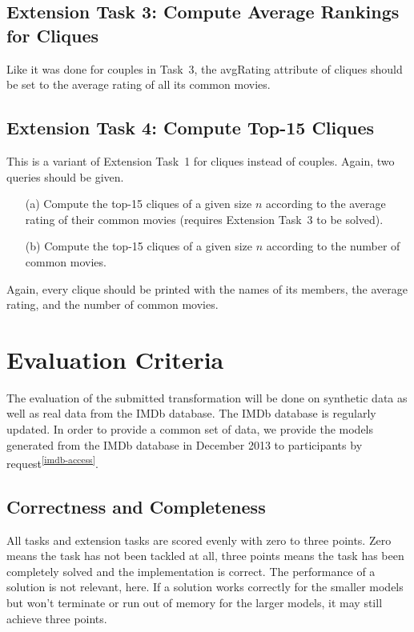 \documentclass[a4paper,11pt]{article}
\newcommand{\p}[1]{\textsf{\small #1}}
\begin{document}
\subsection{Extension Task 3: Compute Average Rankings for Cliques}

Like it was done for couples in Task~3, the \p{avgRating} attribute of
cliques should be set to the average rating of all its common movies.

\subsection{Extension Task 4: Compute Top-15 Cliques}

This is a variant of Extension Task~1 for cliques instead of couples.  Again,
two queries should be given.

\begin{enumerate}
\item[(a)] Compute the top-15 cliques of a given size \(n\) according to the
  average rating of their common movies (requires Extension Task~3 to be
  solved).
\item[(b)] Compute the top-15 cliques of a given size \(n\) according to the
  number of common movies.
\end{enumerate}

Again, every clique should be printed with the names of its members, the
average rating, and the number of common movies.


\section{Evaluation Criteria}\label{sec-eval}

The evaluation of the submitted transformation will be done on synthetic data
as well as real data from the IMDb database.  The IMDb database is regularly
updated.  In order to provide a common set of data, we provide the models
generated from the IMDb database in December 2013 to participants by
request\textsuperscript{\ref{imdb-access}}.

\subsection{Correctness and Completeness}

All tasks and extension tasks are scored evenly with zero to three points.
Zero means the task has not been tackled at all, three points means the task
has been completely solved and the implementation is correct.  The performance
of a solution is not relevant, here.  If a solution works correctly for the
smaller models but won't terminate or run out of memory for the larger models,
it may still achieve three points.
\end{document}
